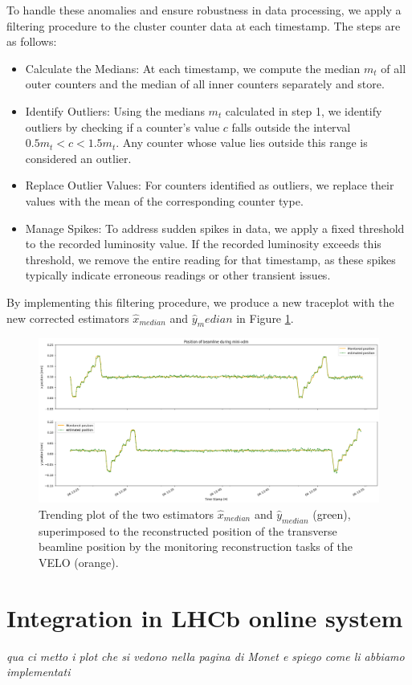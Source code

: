 To handle these anomalies and ensure robustness in data processing, we apply a filtering procedure to the cluster counter data at each timestamp. The steps are as follows:
\begin{itemize}
    \item Calculate the Medians: At each timestamp, we compute the median $m_t$ of all outer counters and the median of all inner counters separately and store.
    \item Identify Outliers: Using the medians $m_t$ calculated in step 1, we identify outliers by checking if a counter's value $c$ falls outside the interval $0.5 m_t < c < 1.5 m_t$. Any counter whose value lies outside this range is considered an outlier.
    \item Replace Outlier Values: For counters identified as outliers, we replace their values with the mean of the corresponding counter type.
    \item Manage Spikes: To address sudden spikes in data, we apply a fixed threshold to the recorded luminosity value. If the recorded luminosity exceeds this threshold, we remove the entire reading for that timestamp, as these spikes typically indicate erroneous readings or other transient issues.
\end{itemize}

By implementing this filtering procedure, we produce a new traceplot with the new corrected estimators $\hat{x}_{median}$ and $\hat{y}_median$ in Figure \ref{fig:traceplot_off}. 

\begin{figure}
    \centering
    \includegraphics[width=\textwidth]{figures/traceplot_zoom.png}
    \caption{Trending plot of the two estimators $\hat{x}_{median}$ and $\hat{y}_{median}$ (green), superimposed to the reconstructed position of the transverse beamline position by the monitoring reconstruction tasks of the VELO (orange).}
    \label{fig:traceplot_off}
\end{figure}



\section{Integration in LHCb online system}
\textit{qua ci metto i plot che si vedono nella pagina di Monet e spiego come li abbiamo implementati}
